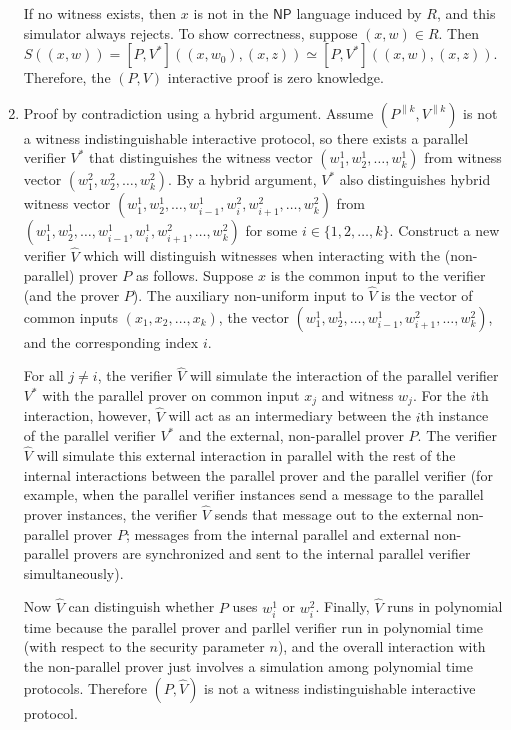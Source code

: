 \documentclass{article}
\begin{document}
\begin{enumerate}
  If no witness exists, then $x$ is not in the $\mathsf{NP}$ language induced by $R$, and this simulator always rejects.
  To show correctness, suppose $(x, w)\in R$.
  Then $S\left((x, w)\right)=[P, V^*]\left((x, w_0), (x, z)\right)\simeq[P, V^*]\left((x, w), (x, z)\right)$.
  Therefore, the $(P, V)$ interactive proof is zero knowledge.

\item
  Proof by contradiction using a hybrid argument.
  Assume $(P^{\|k}, V^{\|k})$ is not a witness indistinguishable interactive protocol, so there exists a parallel verifier $V^*$ that distinguishes the witness vector $(w^1_1, w^1_2, \ldots, w^1_k)$ from witness vector $(w^2_1, w^2_2, \ldots, w^2_k)$.
  By a hybrid argument, $V^*$ also distinguishes hybrid witness vector $(w^1_1, w^1_2, \ldots, w^1_{i-1}, w^2_i, w^2_{i+1}, \ldots, w^2_k)$ from $(w^1_1, w^1_2, \ldots, w^1_{i-1}, w^1_i, w^2_{i+1}, \ldots, w^2_k)$ for some $i\in\{1, 2, \ldots, k\}$.
  Construct a new verifier $\hat{V}$ which will distinguish witnesses when interacting with the (non-parallel) prover $P$ as follows.
  Suppose $x$ is the common input to the verifier (and the prover $P$).
  The auxiliary non-uniform input to $\hat{V}$ is the vector of common inputs $(x_1, x_2, \ldots, x_k)$, the vector $(w^1_1, w^1_2, \ldots, w^1_{i-1}, w^2_{i+1}, \ldots, w^2_k)$, and the corresponding index $i$.

  For all $j\neq i$, the verifier $\hat{V}$ will simulate the interaction of the parallel verifier $V^*$ with the parallel prover on common input $x_j$ and witness $w_j$.
  For the $i$th interaction, however, $\hat{V}$ will act as an intermediary between the $i$th instance of the parallel verifier $V^*$ and the external, non-parallel prover $P$.
  The verifier $\hat{V}$ will simulate this external interaction in parallel with the rest of the internal interactions between the parallel prover and the parallel verifier (for example, when the parallel verifier instances send a message to the parallel prover instances, the verifier $\hat{V}$ sends that message out to the external non-parallel prover $P$; messages from the internal parallel and external non-parallel provers are synchronized and sent to the internal parallel verifier simultaneously).

  Now $\hat{V}$ can distinguish whether $P$ uses $w^1_i$ or $w^2_i$.
  Finally, $\hat{V}$ runs in polynomial time because the parallel prover and parllel verifier run in polynomial time (with respect to the security parameter $n$), and the overall interaction with the non-parallel prover just involves a simulation among polynomial time protocols.
  Therefore $(P, \hat{V})$ is not a witness indistinguishable interactive protocol.
\end{enumerate}
\end{document}
